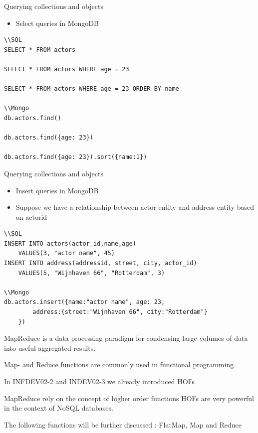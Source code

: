 \documentclass{beamer}
\begin{document}
\begin{frame}[fragile]{Querying collections and objects}
\begin{itemize}
\item Select queries in MongoDB 
\end{itemize}
\begin{lstlisting}
\\SQL
SELECT * FROM actors

SELECT * FROM actors WHERE age = 23 

SELECT * FROM actors WHERE age = 23 ORDER BY name

\\Mongo
db.actors.find()

db.actors.find({age: 23})

db.actors.find({age: 23}).sort({name:1})
\end{lstlisting}
\end{frame}


\begin{frame}[fragile]{Querying collections and objects}
\begin{itemize}
\item Insert queries in MongoDB 
\item Suppose we have a relationship between actor entity and address entity based on actor\textunderscore id
\end{itemize}
\begin{lstlisting}
\\SQL
INSERT INTO actors(actor_id,name,age) 
	VALUES(3, "actor name", 45)
INSERT INTO address(addressid, street, city, actor_id) 
	VALUES(5, "Wijnhaven 66", "Rotterdam", 3)

\\Mongo
db.actors.insert({name:"actor name", age: 23, 
		address:{street:"Wijnhaven 66", city:"Rotterdam"}
	})
\end{lstlisting}
\end{frame}

\begin{slide}{
\item MapReduce is a data processing paradigm for condensing large volumes of data into useful aggregated results.
\item Map- and Reduce functions are commonly used in functional programming   
\item In INFDEV02-2 and INDEV02-3 we already introduced HOFs
\item MapReduce rely on the concept of higher order functions HOFs are very powerful in the context of NoSQL databases. 
\item The following functions will be further discussed : FlatMap, Map and Reduce 
}\end{slide}
\end{document}
